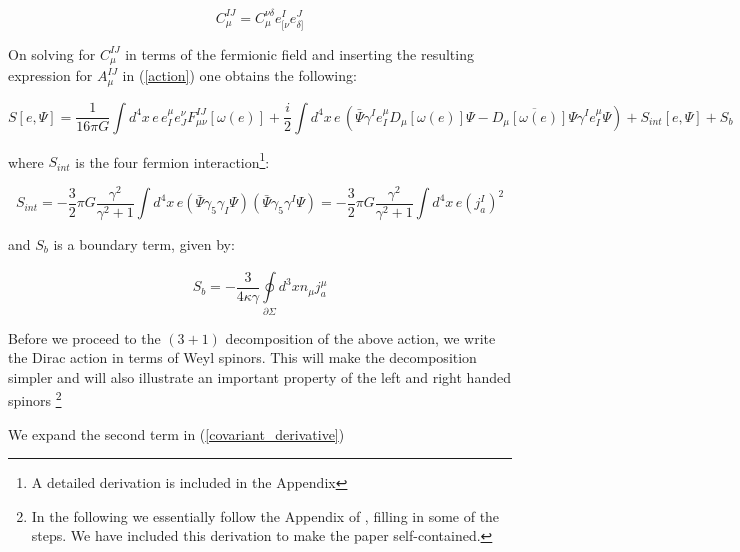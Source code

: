 \begin{doublespace}
\begin{equation}\label{contortion}
    C_{\mu}^{IJ} = C_{\mu}^{\nu\delta}e^{I}_{[\nu}e^{J}_{\delta]}
\end{equation}

On solving for $C_{\mu}^{IJ}$ in terms of the fermionic field and inserting the resulting
expression for $A_{\mu}^{IJ}$ in (\ref{action}) one obtains the following:

\begin{equation}\label{action2}
    S[e,\Psi] = \frac{1}{16\pi G}\int
    d^{4}x\,e\,e^{\mu}_{I}e^{\nu}_{J}F^{IJ}_{\mu\nu}[\omega(e)] + \frac{i}{2}\int d^{4}x\,e\,(\bar{\Psi}\gamma^{I}e^{\mu}_{I}D_{\mu}[\omega(e)]\Psi -
    \overline{D_{\mu}[\omega(e)]\Psi}\gamma^{I}e^{\mu}_{I}\Psi) +
    S_{int}[e,\Psi] + S_b
\end{equation}

where $S_{int}$ is the four fermion interaction\footnote{A detailed derivation is included in the
Appendix}:

\begin{equation}\label{int_action}
    S_{int} = -\frac{3}{2}\pi G \frac{\gamma^{2}}{\gamma^{2}+1}
    \int d^{4}x\,e (\bar{\Psi}\gamma_{5}\gamma_{I}\Psi)(\bar{\Psi}\gamma_{5}\gamma^{I}\Psi)
    = -\frac{3}{2}\pi G \frac{\gamma^{2}}{\gamma^{2}+1} \int d^{4}x\,e (j_a^I)^2
\end{equation}

and $S_b$ is a boundary term, given by:

\begin{equation}\label{boundary_term}
    S_b = -\frac{3}{4\kappa\gamma}\oint\limits_{\partial\Sigma}^{} d^3x n_\mu j_a^\mu
\end{equation}

Before we proceed to the $(3+1)$ decomposition of the above action, we write the Dirac action in
terms of Weyl spinors. This will make the decomposition simpler and will also illustrate an
important property of the left and right handed spinors \footnote{In the following we essentially
follow the Appendix of \cite{Thiemann1998Quantum}, filling in some of the steps. We have included this
derivation to make the paper self-contained.}

We expand the second term in (\ref{covariant_derivative})


\end{doublespace}
